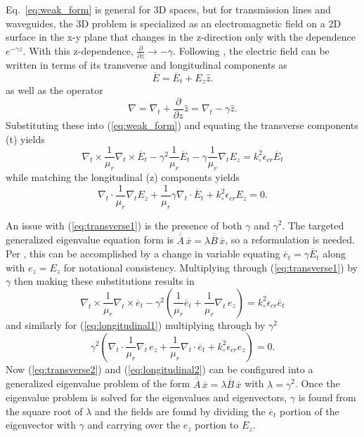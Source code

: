 \documentclass[titlepage]{article}
\renewcommand\_{\textunderscore\linebreak[1]}
\begin{document}
Eq.~\ref{eq:weak_form} is general for 3D spaces, but for transmission lines and waveguides, the 3D problem is specialized as an electromagnetic field on a 2D surface in the x-y plane that changes in the z-direction only with the dependence $e^{-\gamma z}$. With this z-dependence, $\frac{\partial}{\partial z}\rightarrow -\gamma$. Following \cite{Lee}, the electric field can be written in terms of its transverse and longitudinal components as
\begin{equation}
\overline{E}=\overline{E}_t+E_z\hat{z}.
\end{equation} 
as well as the operator
\begin{equation}
\nabla=\nabla_t+\frac{\partial}{\partial z}\hat{z}=\nabla_t-\gamma\hat{z}.
\end{equation}
Substituting these into (\ref{eq:weak_form}) and equating the transverse components (t) yields
\begin{equation}
\label{eq:transverse1}
\nabla_t\times\frac{1}{\mu_r}\nabla_t\times\overline{E}_t-\gamma^2\frac{1}{\mu_r}\overline{E}_t-\gamma\frac{1}{\mu_r}\nabla_t E_z=k_{\circ}^2 \epsilon_{cr}\overline{E}_t
\end{equation}
while matching the longitudinal (z) components yields
\begin{equation}
\label{eq:longitudinal1}
\nabla_t\cdot\frac{1}{\mu_r}\nabla_t E_z+\frac{1}{\mu_r}\gamma\nabla_t\cdot\overline{E}_t+k_{\circ}^2\epsilon_{cr}E_z=0.
\end{equation}

An issue with (\ref{eq:transverse1}) is the presence of both $\gamma$ and $\gamma^2$.  The targeted generalized eigenvalue equation form is $\overline{\overline{A}}\,\overline{x}=\lambda\overline{\overline{B}}\,\overline{x}$, so a reformulation is needed.  Per \cite{Lee}, this can be accomplished by a change in variable equating $\overline{e}_t=\gamma\overline{E}_t$ along with $e_z=E_z$ for notational consistency.  Multiplying through (\ref{eq:transverse1}) by $\gamma$ then making these substitutions results in
\begin{equation}
\label{eq:transverse2}
\nabla_t\times\frac{1}{\mu_r}\nabla_t\times\overline{e}_t-\gamma^2(\frac{1}{\mu_r}\overline{e}_t+\frac{1}{\mu_r}\nabla_t \, e_z)=k_{\circ}^2 \epsilon_{cr}\overline{e}_t
\end{equation}
and similarly for (\ref{eq:longitudinal1}) multiplying through by $\gamma^2$
\begin{equation}
\label{eq:longitudinal2}
\gamma^2(\nabla_t\cdot\frac{1}{\mu_r}\nabla_t \, e_z+\frac{1}{\mu_r}\nabla_t\cdot\overline{e}_t+k_{\circ}^2\epsilon_{cr}e_z)=0.
\end{equation}
Now (\ref{eq:transverse2}) and (\ref{eq:longitudinal2}) can be configured into a generalized eigenvalue problem of the form $\overline{\overline{A}}\,\overline{x}=\lambda\overline{\overline{B}}\,\overline{x}$ with $\lambda=\gamma^2$.  Once the eigenvalue problem is solved for the eigenvalues and eigenvectors, $\gamma$ is found from the square root of $\lambda$ and the fields are found by dividing the $\overline{e}_t$ portion of the eigenvector with $\gamma$ and carrying over the $e_z$ portion to $E_z$.  
\end{document}
